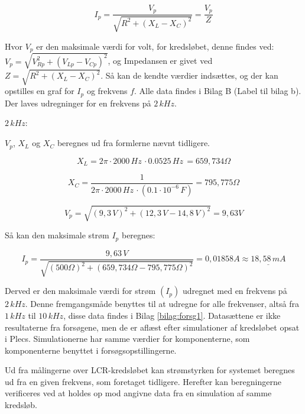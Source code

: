 \begin{equation} 
I_p = \frac{V_p}{\sqrt{R^2 + (X_L - X_C )^2}} = \frac{V_p}{Z}
\label{eq:peak}
\end{equation}

Hvor $V_p$ er den maksimale værdi for volt, for kredsløbet, denne findes ved: $V_p = \sqrt{V^2_{Rp} + (V_{Lp} - V_{Cp})^2}$, og Impedansen er givet ved $Z = \sqrt{R^2 + (X_L - X_C)^2}$. Så kan de kendte værdier indsættes, og der kan opstilles en graf for $I_p$ og frekvens $f$. Alle data findes i Bilag B (Label til bilag b). Der laves udregninger for en frekvens på $2 \, kHz$.

$2 \, kHz$:

$V_p$, $X_L$ og $X_C$ beregnes ud fra formlerne nævnt tidligere.

\begin{equation*}
X_L = 2\pi \cdot 2000 \, Hz \, \cdot 0.0525 \, Hz \, = 659,734 \Omega
\end{equation*}

\begin{equation*}
X_C = \frac{1}{2\pi \cdot 2000 \, Hz \, \cdot (0.1 \cdot 10^{-6} \, F)} = 795,775 \Omega
\end{equation*}

\begin{equation*}
V_p = \sqrt{(9,3 \, V)^2 + (12,3 \, V - 14,8 \, V)^2} = 9,63 V
\end{equation*}

Så kan den maksimale strøm $I_p$ beregnes:

\begin{equation*}
I_p = \frac{9,63 \, V}{\sqrt{(500 \Omega)^2 + (659,734\Omega-795,775\Omega)^2}} = 0,01858 A \approx \underline{18,58 \, mA}
\end{equation*}

Derved er den maksimale værdi for strøm $(I_p)$ udregnet med en frekvens på $2 \, kHz$. Denne fremgangsmåde benyttes til at udregne for alle frekvenser, altså fra $1 \, kHz$ til $10 \, kHz$, disse data findes i Bilag \ref{bilag:forsg1}. Datasættene er ikke resultaterne fra forsøgene, men de er aflæst efter simulationer af kredsløbet opsat i Plecs. Simulationerne har samme værdier for komponenterne, som komponenterne benyttet i forsøgsopstillingerne.

Ud fra målingerne over LCR-kredsløbet kan strømstyrken for systemet beregnes ud fra en given frekvens, som foretaget tidligere. Herefter kan beregningerne verificeres ved at holdes op mod angivne data fra en simulation af samme kredsløb.

